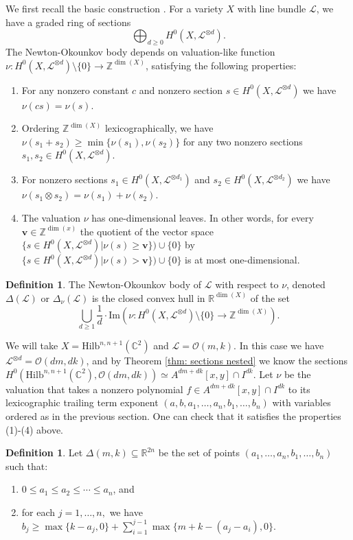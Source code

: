 \documentclass[12pt]{amsart}
\newcommand{\Hilb}{\mathrm{Hilb}}
\newcommand{\C}{\mathbb{C}}
\newcommand{\Z}{\mathbb{Z}}
\newcommand{\R}{\mathbb{R}}
\newcommand{\CO}{\mathcal{O}}
\numberwithin{equation}{section}
\theoremstyle{definition}
\newtheorem{definition}[theorem]{Definition}
\begin{document}
We first recall the basic construction \cite{KK,LM}. For a variety $X$ with line bundle $\mathcal{L}$, we have a graded ring of sections
\[ \bigoplus_{d\geq 0}H^0(X,\mathcal{L}^{\otimes d}). \]
The Newton-Okounkov body depends on valuation-like function $\nu:H^0(X,\mathcal{L}^{\otimes d})\setminus\{0\} \to \Z^{\dim(X)}$, satisfying the following properties:
\begin{enumerate}
    \item For any nonzero constant $c$ and nonzero section $s\in H^0(X,\mathcal{L}^{\otimes d})$ we have $\nu(cs)=\nu(s).$
    \item Ordering $\Z^{\dim(X)}$ lexicographically, we have $\nu(s_1+s_2)\geq \min\{ \nu(s_1),\nu(s_2)\}$ for any two nonzero sections $s_1,s_2\in H^0(X,\mathcal{L}^{\otimes d}).$
    \item For nonzero sections $s_1 \in H^0(X,\mathcal{L}^{\otimes d_1})$ and $s_2 \in H^0(X,\mathcal{L}^{\otimes d_2})$ we have $\nu(s_1\otimes s_2) = \nu(s_1)+\nu(s_2)$.
    \item The valuation $\nu$ has one-dimensional leaves. In other words, for every $\mathbf{v}\in \Z^{\dim(x)}$ the quotient of the vector space $\{s\in H^0(X,\mathcal{L}^{\otimes d})|\nu(s)\geq \mathbf{v}\})\cup \{0\}$ by $\{s\in H^0(X,\mathcal{L}^{\otimes d})|\nu(s)> \mathbf{v}\})\cup \{0\}$ is at most one-dimensional.
\end{enumerate}
\begin{definition}
    The Newton-Okounkov body of $\mathcal{L}$ with respect to $\nu$, denoted $\Delta(\mathcal{L})$ or $\Delta_\nu(\mathcal{L})$ is the closed convex hull in $\R^{\dim(X)}$ of the set
    \[ \bigcup_{d\geq 1} \frac{1}{d}\cdot\text{Im}(\nu:H^0(X,\mathcal{L}^{\otimes d})\setminus\{0\}\to \Z^{\dim(X)}). \]
\end{definition}

We will take $X=\Hilb^{n,n+1}(\C^2)$ and $\mathcal{L}=\mathcal{O}(m,k)$. In this case we have $\mathcal{L}^{\otimes d}= \mathcal{O}(dm,dk)$, and by Theorem \ref{thm: sections nested} we know the sections $H^0(\Hilb^{n,n+1}(\C^2),\CO(dm,dk))\simeq A^{dm+dk}[x,y] \cap I^{dk}$. Let $\nu$ be the valuation that takes a nonzero polynomial $f\in A^{dm+dk}[x,y] \cap I^{dk}$ to its lexicographic trailing term exponent $(a,b,a_1,\dots,a_n,b_1,\dots,b_n)$ with variables ordered as in the previous section.  One can check that it satisfies the properties (1)-(4) above.


\begin{definition}
    Let $\Delta(m,k)\subseteq \R^{2n}$ be the set of points $(a_1,\dots,a_n,b_1,\dots,b_n)$ such that:
    \begin{enumerate}
        \item $0\leq a_1\leq a_2 \leq \cdots \leq a_n$, and
        \item for each $j=1,\dots,n,$ we have $b_j\geq \max\{k-a_j,0\} + \sum_{i=1}^{j-1}\max\{m+k-(a_j-a_i),0\}.$
    \end{enumerate}
\end{definition}
\end{document}
